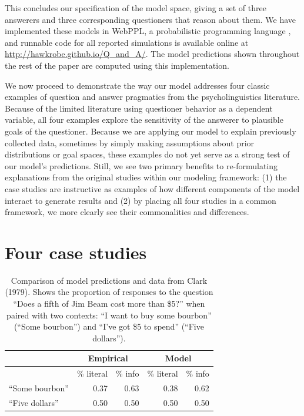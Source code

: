 \documentclass[12pt, floatsintext, jou]{apa6}
\begin{document}
This concludes our specification of the model space, giving a set of three answerers and three corresponding questioners that reason about them. We have implemented these models in WebPPL, a probabilistic programming language \cite{GoodmanStuhlmuller14_DIPPL}, and runnable code for all reported simulations is available online at \url{http://hawkrobe.github.io/Q\_and\_A/}. The model predictions shown throughout the rest of the paper are computed using this implementation. 

We now proceed to demonstrate the way our model addresses four classic examples of question and answer pragmatics from the psycholinguistics literature. Because of the limited literature using questioner behavior as a dependent variable, all four examples explore the sensitivity of the answerer to plausible goals of the questioner. Because we are applying our model to explain previously collected data, sometimes by simply making assumptions about prior distributions or goal spaces, these examples do not yet serve as a strong test of our model's predictions. Still, we see two primary benefits to re-formulating explanations from the original studies within our modeling framework: (1) the case studies are instructive as examples of how different components of the model interact to generate results and (2) by placing all four studies in a common framework, we more clearly see their commonalities and differences. 

\section{Four case studies}

\begin{table}[t]
\centering
\begin{tabular}{ p{3cm} | r | r ||||||  r | r }
& \multicolumn{2}{c||||||}{Empirical} & \multicolumn{2}{c}{Model} \\
\hline
&           \% literal &   \%  info &           \% literal &   \%  info    \\
\hline
``Some bourbon'' &   0.37 & 0.63 &  0.38 & 0.62 \\
\hline
``Five dollars''     & 0.50 & 0.50 & 0.50 & 0.50 \\
\end{tabular}
\\[1.5pt]
\caption{Comparison of model predictions and data from Clark (1979). Shows the proportion of responses to the question ``Does a fifth of Jim Beam cost more than \$5?'' when paired with two contexts: ``I want to buy some bourbon'' (``Some bourbon'') and ``I've got \$5 to spend'' (``Five dollars''). } 
\label{table:clark79exp4}
\end{table}
\end{document}
